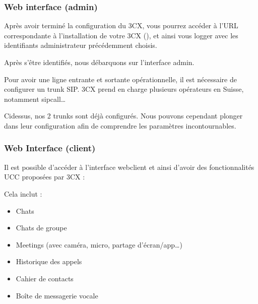 \documentclass[letterpaper,10pt,french]{sphinxmanual}
\begin{document}
\subsubsection{Web interface (admin)}
\label{\detokenize{Documentation-M362:web-interface-admin}}
\sphinxAtStartPar
Après avoir terminé la configuration du 3CX, vous pourrez accéder à l’URL correspondante à l’installation de votre 3CX (), et ainsi vous logger avec les identifiants administrateur précédemment choisis.

\noindent{}

\noindent{}

\sphinxAtStartPar
Après s’être identifiés, nous débarquons sur l’interface admin.

\sphinxAtStartPar
Pour avoir une ligne entrante et sortante opérationnelle, il est nécessaire de configurer un trunk SIP.
3CX prend en charge plusieurs opérateurs en Suisse, notamment sipcall…

\noindent{}

\sphinxAtStartPar
Ci\sphinxhyphen{}dessus, nos 2 trunks sont déjà configurés. Nous pouvons cependant plonger dans leur configuration afin de comprendre les paramètres incontournables.

\noindent{}

\noindent{}


\subsubsection{Web Interface (client)}
\label{\detokenize{Documentation-M362:web-interface-client}}
\sphinxAtStartPar
Il est possible d’accéder à l’interface webclient et ainsi d’avoir des fonctionnalités UCC proposées par 3CX :

\sphinxAtStartPar
Cela inclut :
\begin{itemize}
\item {} 
\sphinxAtStartPar
Chats

\item {} 
\sphinxAtStartPar
Chats de groupe

\item {} 
\sphinxAtStartPar
Meetings (avec caméra, micro, partage d’écran/app…)

\item {} 
\sphinxAtStartPar
Historique des appels

\item {} 
\sphinxAtStartPar
Cahier de contacts

\item {} 
\sphinxAtStartPar
Boîte de messagerie vocale

\end{itemize}
\end{document}

